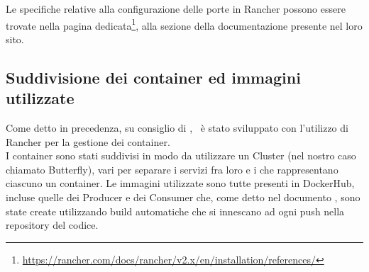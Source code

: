 Le specifiche relative alla configurazione delle porte in Rancher possono essere trovate nella pagina dedicata\footnote{\url{https://rancher.com/docs/rancher/v2.x/en/installation/references/}}, alla sezione della documentazione presente nel loro sito.

\subsection{Suddivisione dei container ed immagini utilizzate}
Come detto in precedenza, su consiglio di \II, \progetto\ è stato sviluppato con l'utilizzo di Rancher per la gestione dei container.\\
I container sono stati suddivisi in modo da utilizzare un Cluster (nel nostro caso chiamato Butterfly), vari  per separare i servizi fra loro e i %
 che rappresentano ciascuno un container.
Le immagini utilizzate sono tutte presenti in DockerHub, incluse quelle dei Producer e dei Consumer che, come detto nel documento \NdPd, sono state create utilizzando build automatiche che si innescano ad ogni push nella repository del codice.

